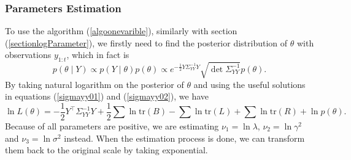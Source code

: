 \subsubsection*{Parameters Estimation}

To use the algorithm (\ref{algoonevarible}), similarly with section (\ref{sectionlogParameter}), we firstly need to find the posterior distribution of $\theta$ with observations $y_{1:t}$, which in fact is 
\begin{equation*}
p(\theta \mid Y) \propto p(Y\mid\theta)p(\theta) \propto e^{-\frac{1}{2} Y \Sigma_{YY}^{-1} Y } \sqrt{\det \Sigma_{YY}^{-1}} p(\theta).
\end{equation*}
By taking natural logarithm on the posterior of $\theta$ and using the useful solutions in equations (\ref{sigmayy01}) and (\ref{sigmayy02}), we have 
\begin{equation}\label{simuOUlogL}
\ln L(\theta) = -\frac{1}{2}Y^\top\Sigma_{YY}^{-1}Y+\frac{1}{2}\sum\ln\mbox{tr}(B)-\sum\ln\mbox{tr}(L)+\sum\ln\mbox{tr}(R) + \ln p(\theta).
\end{equation}
Because of all parameters are positive, we are estimating $\nu_1=\ln\lambda$, $\nu_2=\ln\gamma^2$ and $\nu_3=\ln\sigma^2$ instead. When the estimation process is done, we can transform them back to the original scale by taking exponential. 


